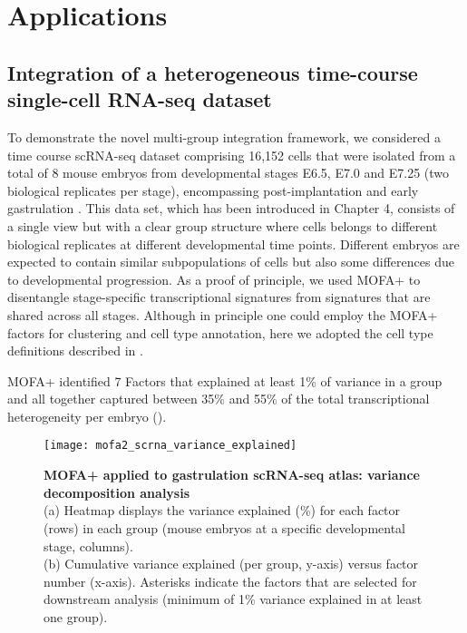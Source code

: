 \section{Applications}

\subsection{Integration of a heterogeneous time-course single-cell RNA-seq dataset}

To demonstrate the novel multi-group integration framework, we considered a time course scRNA-seq dataset comprising 16,152 cells that were isolated from a total of 8 mouse embryos from developmental stages E6.5, E7.0 and E7.25 (two biological replicates per stage), encompassing post-implantation and early gastrulation \cite{Pijuan-Sala2019}. This data set, which has been introduced in Chapter 4, consists of a single view but with a clear group structure where cells belongs to different biological replicates at different developmental time points. Different embryos are expected to contain similar subpopulations of cells but also some differences due to developmental progression. As a proof of principle, we used MOFA+ to disentangle stage-specific transcriptional signatures from signatures that are shared across all stages. Although in principle one could employ the MOFA+ factors for clustering and cell type annotation, here we adopted the cell type definitions described in \cite{Pijuan-Sala2019}.

MOFA+ identified 7 Factors that explained at least 1\% of variance in a group and all together captured between 35\% and 55\% of the total transcriptional heterogeneity per embryo ().

\begin{figure}[H]
	\centering
	\texttt{[image: mofa2\_scrna\_variance\_explained]}
	\caption[]{
	\textbf{MOFA+ applied to gastrulation scRNA-seq atlas: variance decomposition analysis} \\
	(a) Heatmap displays the variance explained (\%) for each factor (rows) in each group (mouse embryos at a specific developmental stage, columns).\\
	(b) Cumulative variance explained (per group, y-axis) versus factor number (x-axis). Asterisks indicate the factors that are selected for downstream analysis (minimum of 1\% variance explained in at least one group).
	}
	\label{fig:mofa2_scrna_variance_explained}
\end{figure}


